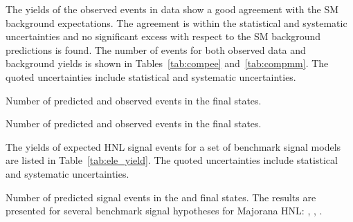 The yields of the observed events in data show a good agreement with the
SM background expectations. The agreement is within the statistical
and systematic uncertainties and no significant
excess with respect to the SM background predictions is found. The number of
events for both observed data and background yields is shown in
Tables~\ref{tab:compee} and~\ref{tab:compmm}. The quoted uncertainties include statistical and systematic uncertainties.


\begin{table}[h!]
    \footnotesize
    \renewcommand{\arraystretch}{1.3}
    \centering
    \caption{\label{tab:compee}
        Number of predicted and observed events
        in the \eex final states. 
    }
    
\end{table}
\vspace{10cm}
\begin{table}[h!]
    \footnotesize
    \renewcommand{\arraystretch}{1.3}
    \centering
    \caption{\label{tab:compmm}
        Number of predicted and observed events
        in the \mmx final states. 
    }
    
\end{table}

The yields of expected HNL signal events for a set of benchmark signal
models are listed in Table~\ref{tab:ele_yield}. The quoted uncertainties include statistical and systematic uncertainties.

\begin{table}[h!]
    {\footnotesize
    \renewcommand{\arraystretch}{1.1}
    \centering
    \caption{\label{tab:ele_yield}
        Number of predicted signal events in the \eex and \mmx final states.
        The results are presented for several benchmark signal hypotheses for Majorana HNL:
        \HNLtwo, \HNLsix, \HNLtwelve.
    }}
    \cmsTable{}\\
    \cmsTable{}
\end{table}



